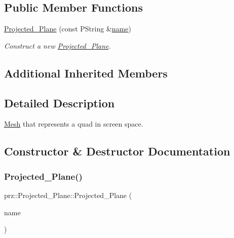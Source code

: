 \subsection*{Public Member Functions}
\begin{DoxyCompactItemize}
\item 
\mbox{\hyperlink{classprz_1_1_projected___plane_a3d1fa27df5ad24d72d2f9221e612b658}{Projected\+\_\+\+Plane}} (const P\+String \&\mbox{\hyperlink{classprz_1_1_mesh_ae2a7cec3a1cb7409ea2017cd729fe683}{name}})
\begin{DoxyCompactList}\small\item\em Construct a new \mbox{\hyperlink{classprz_1_1_projected___plane}{Projected\+\_\+\+Plane}}. \end{DoxyCompactList}\end{DoxyCompactItemize}
\subsection*{Additional Inherited Members}


\subsection{Detailed Description}
\mbox{\hyperlink{classprz_1_1_mesh}{Mesh}} that represents a quad in screen space. 



\subsection{Constructor \& Destructor Documentation}
\mbox{\label{classprz_1_1_projected___plane_a3d1fa27df5ad24d72d2f9221e612b658}} 
\subsubsection{\texorpdfstring{Projected\_Plane()}{Projected\_Plane()}}
{\footnotesize\ttfamily prz\+::\+Projected\+\_\+\+Plane\+::\+Projected\+\_\+\+Plane (\begin{DoxyParamCaption}\item[{const P\+String \&}]{name }\end{DoxyParamCaption})}



